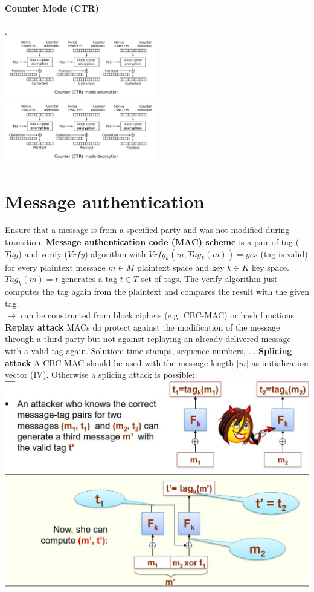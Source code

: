 \documentclass[12pt]{article}
\begin{document}
	\paragraph{Counter Mode (CTR)} .\\
	\includegraphics[width=0.5\textwidth]{figures/Ctr_encryption.png}
	\includegraphics[width=0.5\textwidth]{figures/Ctr_decryption.png}
	
	\section{Message authentication}
	Ensure that a message is from a specified party and was not modified during transition.
	\textbf{Message authentication code (MAC) scheme} is a pair of tag ($Tag$) and verify ($Vrfy$) algorithm with $Vrfy_k(m,Tag_k(m)) = yes$ (tag is valid) for every plaintext message $m \in M$ plaintext space and key $k \in K$ key space. $Tag_k(m) = t$ generates a tag $t \in T$ set of tags. The verify algorithm just computes the tag again from the plaintext and compares the result with the given tag.\\
	$\rightarrow$ can be constructed from block ciphers (e.g. CBC-MAC) or hash functions\\
	\textbf{Replay attack} MACs do protect against the modification of the message through a third party but not against replaying an already delivered message with a valid tag again. Solution: time-stamps, sequence numbers, ...
	\textbf{Splicing attack} A CBC-MAC should be used with the message length $|m|$ as initialization vector (IV). Otherwise a splicing attack is possible:\\
	\includegraphics[width=\textwidth]{figures/splicing-attack.JPG}
	
\end{document}
